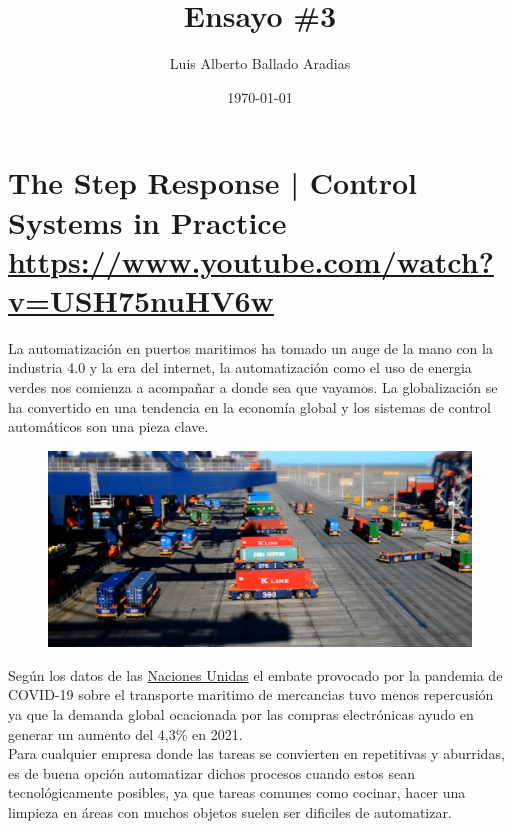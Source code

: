 \documentclass[
	12pt, %
]{fphw}
\title{Ensayo \#3} %
\author{Luis Alberto Ballado Aradias} %
\date{\today} %
\institute{Centro de Investigación y de Estudios Avanzados del IPN \\ Unidad Tamaulipas} %
\begin{document}
\maketitle %

\section*{{\color{Apricot}The Step Response | Control Systems in Practice} \url{https://www.youtube.com/watch?v=USH75nuHV6w}}

La automatización en puertos maritimos ha tomado un auge de la mano con la industria 4.0 y la era del internet, la automatización como el uso de energia verdes nos comienza a acompañar a donde sea que vayamos. La globalización se ha convertido en una tendencia en la economía global y los sistemas de control automáticos son una pieza clave.\\

\begin{figure}[H]
  \centering
  \includegraphics[scale=0.4]{images/agv.png}
\end{figure}

Según los datos de las \href{https://news.un.org/es/story/2021/11/1500122}{Naciones Unidas} el embate provocado por la pandemia de COVID-19 sobre el transporte maritimo de mercancias tuvo menos repercusión ya que la demanda global ocacionada por las compras electrónicas ayudo en generar un aumento del 4,3\% en 2021. \\

Para cualquier empresa donde las tareas se convierten en repetitivas y aburridas, es de buena opción automatizar dichos procesos cuando estos sean tecnológicamente posibles, ya que tareas comunes como cocinar, hacer una limpieza en áreas con muchos objetos suelen ser dificiles de automatizar.\\
\end{document}
